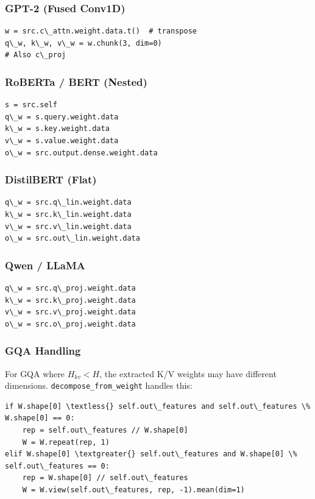 \subsubsection{GPT-2 (Fused Conv1D)}

\begin{lstlisting}
w = src.c\_attn.weight.data.t()  # transpose
q\_w, k\_w, v\_w = w.chunk(3, dim=0)
# Also c\_proj
\end{lstlisting}

\subsubsection{RoBERTa / BERT (Nested)}

\begin{lstlisting}
s = src.self
q\_w = s.query.weight.data
k\_w = s.key.weight.data
v\_w = s.value.weight.data
o\_w = src.output.dense.weight.data
\end{lstlisting}

\subsubsection{DistilBERT (Flat)}

\begin{lstlisting}
q\_w = src.q\_lin.weight.data
k\_w = src.k\_lin.weight.data
v\_w = src.v\_lin.weight.data
o\_w = src.out\_lin.weight.data
\end{lstlisting}

\subsubsection{Qwen / LLaMA}

\begin{lstlisting}
q\_w = src.q\_proj.weight.data
k\_w = src.k\_proj.weight.data
v\_w = src.v\_proj.weight.data
o\_w = src.o\_proj.weight.data
\end{lstlisting}

\subsubsection{GQA Handling}

For GQA where $H_{kv} < H$, the extracted K/V weights may have different 
dimensions. \texttt{decompose\_from\_weight} handles this:

\begin{lstlisting}
if W.shape[0] \textless{} self.out\_features and self.out\_features \% W.shape[0] == 0:
    rep = self.out\_features // W.shape[0]
    W = W.repeat(rep, 1)
elif W.shape[0] \textgreater{} self.out\_features and W.shape[0] \% self.out\_features == 0:
    rep = W.shape[0] // self.out\_features
    W = W.view(self.out\_features, rep, -1).mean(dim=1)
\end{lstlisting}

